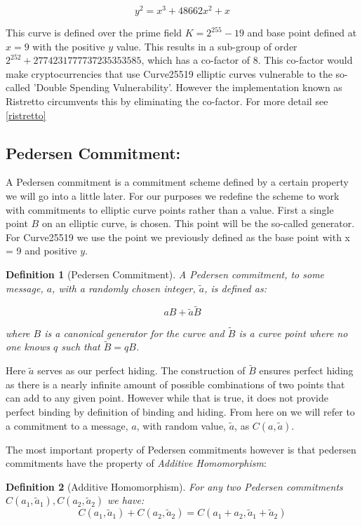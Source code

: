 \documentclass{article}
\newtheorem{definition}{Definition}[section]
\newcommand{\tB}{\widetilde{B}}
\begin{document}
$$y^2 = x^3 + 48662x^2 + x$$

This curve is defined over the prime field $K = 2^{255} - 19$ and base
point defined at $x = 9$ with the positive $y$ value. This results in a
sub-group of order $2^{252} + 2774231777737235353585$, which has a
co-factor of $8$. This co-factor would make cryptocurrencies that use
Curve25519 elliptic curves vulnerable to the so-called 'Double Spending
Vulnerability'. However the implementation known as Ristretto circumvents
this by eliminating the co-factor. For more detail see \ref{ristretto}

\subsection{Pedersen Commitment:}

A Pedersen commitment is a commitment scheme defined by a certain
property we will go into a little later. For our purposes we redefine
the scheme to work with commitments to elliptic curve points rather than
a value. First a single point $B$ on an elliptic curve, is chosen. This point will be the so-called generator. For
Curve25519 we use the point we previously defined as the base point with x =
9 and positive $y$.

\begin{definition}[Pedersen Commitment]
	A Pedersen commitment, to some message, $a$, with a randomly chosen
	integer, $\widetilde{a}$, is defined as:

	$$aB + \widetilde{a}\tB$$

	where $B$ is a canonical generator for the curve and $\tB$
	is a curve point where no one knows $q$ such that $\tB = qB$.
\end{definition}

Here $\widetilde{a}$ serves as our perfect hiding. The construction of $\tB$ ensures perfect hiding as there is a nearly infinite
amount of possible combinations of two points that can add to any given
point. However while that is true, it does not provide perfect binding by
definition of binding and hiding. From here on we will refer to a
commitment to a message, $a$, with random value, $\widetilde{a}$, as $C(a,\widetilde{a})$.

The most important property of Pedersen commitments however is
that pedersen commitments have the property of \textit{Additive
Homomorphism}:

\begin{definition}[Additive Homomorphism]
	For any two Pedersen commitments $C(a_1,\widetilde{a}_1), C(a_2,\widetilde{a}_2)$ we have:
	$$ C(a_1,\widetilde{a}_1) + C(a_2,\widetilde{a}_2) = C(a_1 + a_2, \widetilde{a}_1 + \widetilde{a}_2)$$
\end{definition}
\end{document}
